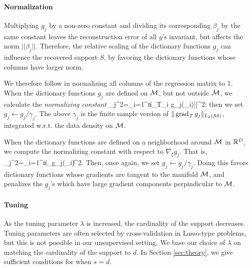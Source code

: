 \paragraph{Normalization}
\label{sec:ouralg-normalization}
Multiplying $g_j$ by a non-zero constant and dividing
its corresponding $\beta_j$ by the same constant leaves the
reconstruction error of all $y$'s invariant, but affects the norm
$||\beta_j||$. Therefore, the relative scaling of the dictionary
functions $g_j$ can influence the recovered support $S$, by favoring
the dictionary functions whose columns have larger norm.

We therefore follow \citet{Haufe2009-yt} in normalizing all columns of the regression matrix to 1. When the dictionary functions $g_j$ are defined on ${\cal M}$, but not
outside ${\cal M}$, we calculate the {\em normalizing constant}
\beq \label{eq:gammaj-discrete-M}
\gamma_j^2\;=\;\sum_{i=1}^n\|\grad_{T_i} g_j(\xi_i)||^2;
\eeq
%
then we set $g_j\leftarrow g_j/\gamma_j$.  The above $\gamma_j$ is the
finite sample version of $\|\operatorname{grad}_{\cal T} g_j\|_{L_2({\cal M})}$, integrated
w.r.t. the data density on ${\cal M}$.

When the dictionary functions are defined on a neighborhood around ${\cal M}$ in ${\mathbb R}^D$, we compute the normalizing constant with respect to  $\nabla_\xi g_j$. That is,
\beq \label{eq:gammaj-discrete-xi}
\gamma_j^2\;=\;\sum_{i=1}^n\| \nabla_\xi g_j(\xi_i)\|^2.
\eeq
Then, once again, we set $g_j\leftarrow g_j/\gamma_j$. Doing this favors dictionary functions whose gradients are tangent to the manifold ${\cal M}$, and penalizes the $g_j$'s which have large gradient components perpindicular to ${\cal M}$.

\paragraph{Tuning}
 As the tuning parameter $\lambda$ is
increased, the cardinality of the support decreases.  Tuning
parameters are often selected by cross-validation in Lasso-type
problems, but this is not possible in our unsupervised setting. We
base our choice of $\lambda$ on matching the cardinality of the
support to $d$. In Section 
\ref{sec:theory}, we give sufficient conditions for when $s=d$.


